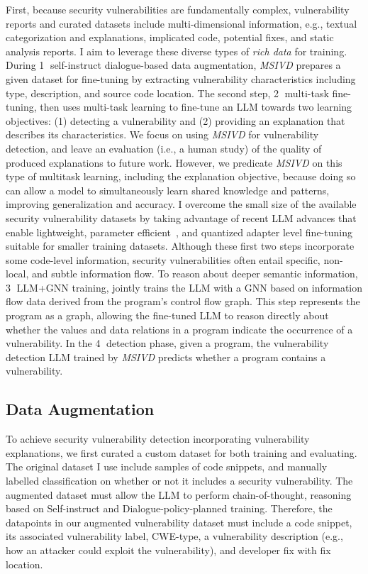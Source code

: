 \documentclass[12pt,openany,oneside,table]{cmuthesis}
\begin{document}
First, because security vulnerabilities are fundamentally complex, 
vulnerability reports and curated datasets include multi-dimensional information, e.g., textual categorization and explanations, implicated code, potential fixes, and static analysis reports.  
I aim to leverage these diverse types of \emph{rich data} for training. 
During \textcircled{1} self-instruct dialogue-based data augmentation, \textit{MSIVD} prepares a given dataset for fine-tuning by extracting vulnerability characteristics including type, description, and source code location. 
The second step, \textcircled{2} multi-task fine-tuning, then uses multi-task learning to fine-tune an LLM towards two learning objectives:
(1) detecting a vulnerability and (2) providing an explanation that describes its characteristics. We focus on using \textit{MSIVD} for vulnerability detection, and leave an evaluation (i.e., a human study) of the quality of produced explanations to future work. However, we predicate \textit{MSIVD} on this type of multitask learning, including the explanation objective, because doing so can allow a model to simultaneously learn shared knowledge and patterns, improving generalization and accuracy. 
I overcome the small size of the available security vulnerability datasets
by taking advantage of recent LLM advances that enable lightweight, parameter efficient~\cite{peft}, and quantized adapter level fine-tuning~\cite{Llmao} suitable for smaller training datasets. 
Although these first two steps incorporate some code-level information, security vulnerabilities often entail specific, non-local, and subtle information flow.  
To reason about deeper semantic information, 
\textcircled{3} LLM+GNN training, jointly trains the LLM with a GNN based on information flow data derived from the program's control flow graph. 
This step represents the program as a graph, allowing the fine-tuned LLM to reason directly about 
whether the values and
data relations in a program indicate the occurrence of a vulnerability. 
In the \textcircled{4} detection phase, given a program, the vulnerability detection LLM trained by \textit{MSIVD} predicts whether a program contains a vulnerability.


\subsection{Data Augmentation}
To achieve security vulnerability detection incorporating vulnerability explanations, we first curated a custom dataset for both training and evaluating. The original dataset I use include samples of code snippets, and manually labelled classification on whether or not it includes a security vulnerability. The augmented dataset must allow the LLM to perform chain-of-thought, reasoning based on Self-instruct and Dialogue-policy-planned training. Therefore, the datapoints in our augmented vulnerability dataset must include a code snippet, its associated vulnerability label, CWE-type, a vulnerability description (e.g., how an attacker could exploit the vulnerability), and developer fix with fix location. 
\end{document}
